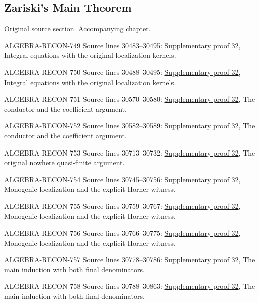 \subsection{Zariski's Main Theorem}
\hypertarget{algebra-source-section-Zariski}{}
\noindent\href{https://github.com/stacks/stacks-project/blob/a04446e57ec1fbc252a871afcec7752fb2807b14/algebra.tex\#L30454}{Original source section}. \href{algebra.pdf\#nameddest=section-Zariski}{Accompanying chapter}.

\begin{AlgebraSourceRoutes}
\item[ALGEBRA-RECON-749] Source lines 30483--30495: \hyperlink{algebra_zariski_main_notes_20260928}{Supplementary proof 32}, Integral equations with the original localization kernels.
\item[ALGEBRA-RECON-750] Source lines 30488--30495: \hyperlink{algebra_zariski_main_notes_20260928}{Supplementary proof 32}, Integral equations with the original localization kernels.
\item[ALGEBRA-RECON-751] Source lines 30570--30580: \hyperlink{algebra_zariski_main_notes_20260928}{Supplementary proof 32}, The conductor and the coefficient argument.
\item[ALGEBRA-RECON-752] Source lines 30582--30589: \hyperlink{algebra_zariski_main_notes_20260928}{Supplementary proof 32}, The conductor and the coefficient argument.
\item[ALGEBRA-RECON-753] Source lines 30713--30732: \hyperlink{algebra_zariski_main_notes_20260928}{Supplementary proof 32}, The original nowhere quasi-finite argument.
\item[ALGEBRA-RECON-754] Source lines 30745--30756: \hyperlink{algebra_zariski_main_notes_20260928}{Supplementary proof 32}, Monogenic localization and the explicit Horner witness.
\item[ALGEBRA-RECON-755] Source lines 30759--30767: \hyperlink{algebra_zariski_main_notes_20260928}{Supplementary proof 32}, Monogenic localization and the explicit Horner witness.
\item[ALGEBRA-RECON-756] Source lines 30766--30775: \hyperlink{algebra_zariski_main_notes_20260928}{Supplementary proof 32}, Monogenic localization and the explicit Horner witness.
\item[ALGEBRA-RECON-757] Source lines 30778--30786: \hyperlink{algebra_zariski_main_notes_20260928}{Supplementary proof 32}, The main induction with both final denominators.
\item[ALGEBRA-RECON-758] Source lines 30788--30863: \hyperlink{algebra_zariski_main_notes_20260928}{Supplementary proof 32}, The main induction with both final denominators.

\end{AlgebraSourceRoutes}
